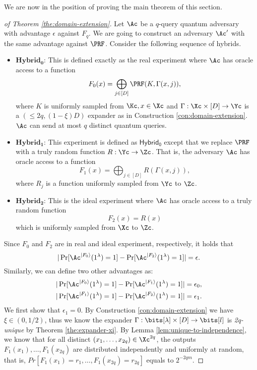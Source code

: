 We are now in the position of proving the main theorem of this section.
\begin{proof}[of Theorem \ref{the:domain-extension}]
	Let $\Ac$ be a $q$-query quantum adversary with advantage $\epsilon$ against $F_q$. We are going to construct an adversary $\Ac'$ with the same advantage against $\PRF$.
Consider the following sequence of hybrids.
	\begin{itemize}
		\item $\mathsf{\mathbf{Hybrid_0}}$: This is defined exactly as the real experiment where $\Ac$ has oracle access to a function $$F_0(x)=\bigoplus_{j\in [D]} \PRF(K,\Gamma(x,j)),$$ where $K$ is uniformly sampled from $\Kc, x\in\Xc$ and $\Gamma:\Xc\times[D]\to\Yc$ is a $(\leq 2q, (1-\xi)D)$ expander as in Construction \ref{con:domain-extension}. $\Ac$ can send at most $q$ distinct quantum queries.

		\item $\mathsf{\mathbf{Hybrid_1}}$: This experiment is defined as $\mathsf{Hybrid_0}$ except that we replace $\PRF$ with a truly random function $R:\Yc\to\Zc$. That is, the adversary $\Ac$ has oracle access to a function $$F_1(x) = \bigoplus_{j\in [D]} R(\Gamma(x,j)),$$ where $R_j$ is a function uniformly sampled from $\Yc$ to $\Zc$.

		\item $\mathsf{\mathbf{Hybrid_2}}$: This is the ideal experiment where $\Ac$ has oracle access to a truly random function $$F_2(x)=R(x)$$ which is uniformly sampled from $\Xc$ to $\Zc$.
	\end{itemize}
%
	Since $F_0$ and $F_2$ are in real and ideal experiment, respectively, it holds that $$|\Pr[\Ac^{|F_0\rangle}(1^\lambda)=1]-\Pr[\Ac^{|F_2\rangle}(1^\lambda)=1]|=\epsilon.$$ Similarly, we can define two other advantages as: 
	\begin{align*}
		|\Pr[\Ac^{|F_0\rangle}(1^\lambda)=1]-\Pr[\Ac^{|F_1\rangle}(1^\lambda)=1]| &= \epsilon_0,\\
		|\Pr[\Ac^{|F_1\rangle}(1^\lambda)=1]-\Pr[\Ac^{|F_2\rangle}(1^\lambda)=1]| &= \epsilon_1.
	\end{align*}
%
	We first show that $\epsilon_1=0$. By Construction \ref{con:domain-extension} we have $\xi\in(0,1/2)$, thus we know the expander $\Gamma:\bits[\lambda]\times[D]\to\bits[l]$ is \textit{2q-unique} by Theorem \ref{the:expander-xi}. By Lemma \ref{lem:unique-to-independence}, we know that for all distinct $(x_1, \dots, x_{2q}) \in \Xc^{2q}$, the outputs $F_1(x_1),\dots, F_1(x_{2q})$ are distributed independently and uniformly at random, that is, $Pr[F_1(x_1)=r_1,\dots, F_1(x_{2q})=r_{2q}]$ equals to $2^{-2qm}$.


\end{proof}
